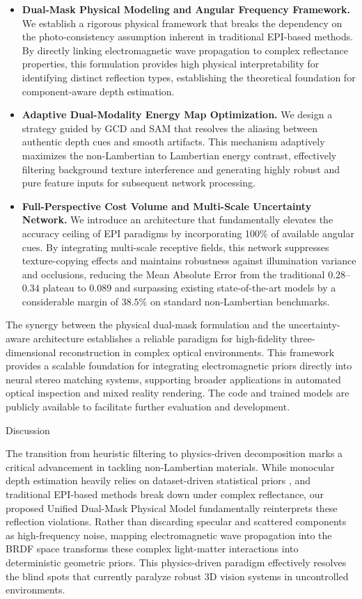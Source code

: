 \documentclass[lettersize,journal]{IEEEtran}
\begin{document}
\begin{itemize}
    \item \textbf{Dual-Mask Physical Modeling and Angular Frequency Framework.} We establish a rigorous physical framework that breaks the dependency on the photo-consistency assumption inherent in traditional EPI-based methods. By directly linking electromagnetic wave propagation to complex reflectance properties, this formulation provides high physical interpretability for identifying distinct reflection types, establishing the theoretical foundation for component-aware depth estimation.
    \item \textbf{Adaptive Dual-Modality Energy Map Optimization.} We design a strategy guided by GCD and SAM that resolves the aliasing between authentic depth cues and smooth artifacts. This mechanism adaptively maximizes the non-Lambertian to Lambertian energy contrast, effectively filtering background texture interference and generating highly robust and pure feature inputs for subsequent network processing.
    \item \textbf{Full-Perspective Cost Volume and Multi-Scale Uncertainty Network.} We introduce an architecture that fundamentally elevates the accuracy ceiling of EPI paradigms by incorporating 100\% of available angular cues. By integrating multi-scale receptive fields, this network suppresses texture-copying effects and maintains robustness against illumination variance and occlusions, reducing the Mean Absolute Error from the traditional $0.28$--$0.34$ plateau to $0.089$ and surpassing existing state-of-the-art models by a considerable margin of $38.5\%$ on standard non-Lambertian benchmarks.
\end{itemize}

The synergy between the physical dual-mask formulation and the uncertainty-aware architecture establishes a reliable paradigm for high-fidelity three-dimensional reconstruction in complex optical environments. This framework provides a scalable foundation for integrating electromagnetic priors directly into neural stereo matching systems, supporting broader applications in automated optical inspection and mixed reality rendering. The code and trained models are publicly available to facilitate further evaluation and development.

Discussion

The transition from heuristic filtering to physics-driven decomposition marks a critical advancement in tackling non-Lambertian materials. While monocular depth estimation heavily relies on dataset-driven statistical priors \cite{eigen2014, godard2019}, and traditional EPI-based methods \cite{wanner2014} break down under complex reflectance, our proposed Unified Dual-Mask Physical Model fundamentally reinterprets these reflection violations. Rather than discarding specular and scattered components as high-frequency noise, mapping electromagnetic wave propagation into the BRDF space \cite{blinn1977} transforms these complex light-matter interactions into deterministic geometric priors. This physics-driven paradigm effectively resolves the blind spots that currently paralyze robust 3D vision systems in uncontrolled environments.
\end{document}
